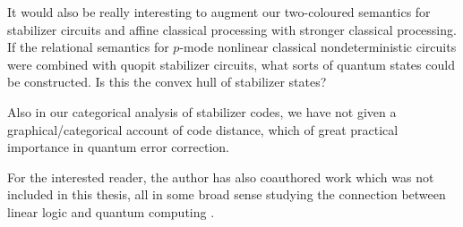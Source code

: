 It would also be really interesting to augment our two-coloured semantics for stabilizer circuits and affine classical processing with stronger classical processing.  If the relational semantics for $p$-mode nonlinear classical nondeterministic circuits were combined with quopit stabilizer circuits, what sorts of quantum states could be constructed.  Is this the convex hull of stabilizer states?

Also in our categorical analysis of stabilizer codes, we have not given a graphical/categorical account of code distance, which of great practical importance in quantum error correction. 





For the interested reader, the author has also coauthored work which was not included in this thesis, all in some broad sense studying the connection between linear logic and quantum computing \cite{2010.13361,Cockett2021,Hefford2023}.

